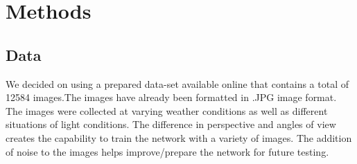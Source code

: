 \documentclass[conference]{IEEEtran}
\begin{document}
\section{Methods}

\subsection{Data}
We decided on using a prepared data-set available online that contains a total of 12584 images.The images have already been formatted in .JPG image format. The images were collected at varying weather conditions as well as different situations of light conditions. The difference in perspective and angles of view creates the capability to train the network with a variety of images. The addition of noise to the images helps improve/prepare the network for future testing.
\end{document}

